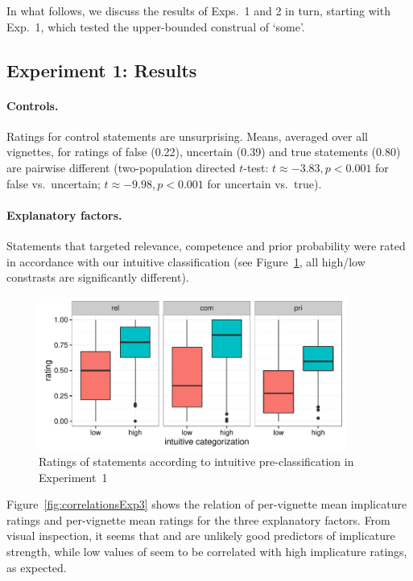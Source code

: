 \documentclass[12pt]{article}
\begin{document}
In what follows, we discuss the results of Exps.\ 1 and 2 in turn, starting with Exp.\ 1, which tested the upper-bounded construal of `some'.

\subsection*{Experiment 1: Results}

\paragraph{Controls.} Ratings for control statements are unsurprising. Means, averaged over all
vignettes, for ratings of false (0.22), uncertain (0.39) and true statements (0.80) are
pairwise different (two-population directed $t$-test: $t \approx - 3.83, p < 0.001$ for false
vs.~uncertain; $t \approx - 9.98, p < 0.001$ for uncertain vs.~true).

\paragraph{Explanatory factors.} Statements that targeted relevance, competence and prior
probability were rated in accordance with our intuitive classification (see
Figure~\ref{fig:factorBoxPlotsExp3}, all high/low constrasts are significantly different).

\begin{figure}
  \centering

  \includegraphics[width = 0.9\textwidth]{pics/factorBoxPlotExp3.pdf}
  
  \caption{Ratings of statements according to intuitive pre-classification in Experiment~1}
  \label{fig:factorBoxPlotsExp3}
\end{figure}

Figure~\ref{fig:correlationsExp3} shows the relation of per-vignette mean implicature ratings
and per-vignette mean ratings for the three explanatory factors. From visual inspection, it
seems that \rel and \com are unlikely good predictors of implicature strength, while low values
of \pri seem to be correlated with high implicature ratings, as expected.
\end{document}
